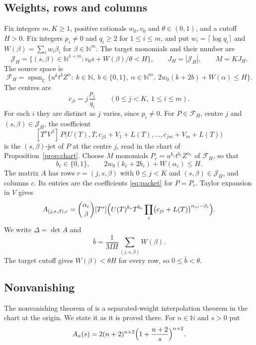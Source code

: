 \documentclass[11pt]{amsart}
\theoremstyle{definition}
\theoremstyle{remark}
\numberwithin{equation}{section}
\newcommand{\C}{\mathbb C}
\newcommand{\N}{\mathbb N}
\newcommand{\cJ}{\mathcal J}
\newcommand{\cF}{\mathcal F}
\newcommand{\bb}{\bar b}
\newcommand{\CM}{\cite{ChudnovskyChudnovsky26}}
\begin{document}
\subsection{Weights, rows and columns}
Fix integers $m,K\ge1$, positive rationals $w_0,v_0$ and $\theta\in(0,1)$, and a cutoff $H>0$. Fix integers
$p_i\ne0$ and $q_i\ge2$ for $1\le i\le m$, and put $w_i=\lceil\log q_i\rceil$ and $W(\beta)=\sum_iw_i\beta_i$
for $\beta\in\N^m$. The target monomials and their number are
\[
 \cJ_H=\{(s,\beta)\in\N^{1+m}:v_0s+W(\beta)/\theta<H\},\qquad J_H=|\cJ_H|,\qquad M=KJ_H.
\]
The source space is
\[
 \cF_H=\operatorname{span}_\C\{u^kt^bZ^\alpha:\ k\in\N,\ b\in\{0,1\},\ \alpha\in\N^m,\
 2w_0(k+2b)+W(\alpha)\le H\}.
\]
The centres are
\[
 c_{ji}=j\,\frac{p_i}{q_i}\qquad(0\le j<K,\ 1\le i\le m).
\]
For each $i$ they are distinct as $j$ varies, since $p_i\ne0$. For $P\in\cF_H$, centre $j$ and
$(s,\beta)\in\cJ_H$, the coefficient
\begin{equation}\label{eq:packet}
 [T^sV^\beta]\,P\bigl(U(T),T,c_{j1}+V_1+L(T),\dots,c_{jm}+V_m+L(T)\bigr)
\end{equation}
is the $(s,\beta)$-jet of $P$ at the centre $j$, read in the chart of Proposition~\ref{prop:chart}. Choose $M$
monomials $P_c=u^{k_c}t^{b_c}Z^{\alpha_c}$ of $\cF_H$, so that
\begin{equation*}
 b_c\in\{0,1\},\qquad 2w_0(k_c+2b_c)+W(\alpha_c)\le H.\tag{S}\label{eq:S}
\end{equation*}
The matrix $A$ has rows $r=(j,s,\beta)$ with $0\le j<K$ and $(s,\beta)\in\cJ_H$, and columns $c$. Its entries
are the coefficients \eqref{eq:packet} for $P=P_c$. Taylor expansion in $V$ gives
\begin{equation}\label{eq:entry}
 A_{(j,s,\beta),c}=\binom{\alpha_c}{\beta}[T^s]\Bigl(U(T)^{k_c}T^{b_c}\prod_i\bigl(c_{ji}+L(T)\bigr)^{
 \alpha_{ci}-\beta_i}\Bigr).
\end{equation}
We write $\Delta=\det A$ and
\[
 \bb=\frac1{MH}\sum_{(j,s,\beta)}W(\beta).
\]
The target cutoff gives $W(\beta)<\theta H$ for every row, so $0\le\bb<\theta$.

\subsection{Nonvanishing}
The nonvanishing theorem of \CM{} is a separated-weight interpolation theorem in the chart at the origin. We
state it as it is proved there. For $n\in\N$ and $s>0$ put
\[
 A_n(s)=2(n+2)^{n+2}\Bigl(1+\frac{n+2}s\Bigr)^{n+2}.
\]
\end{document}
